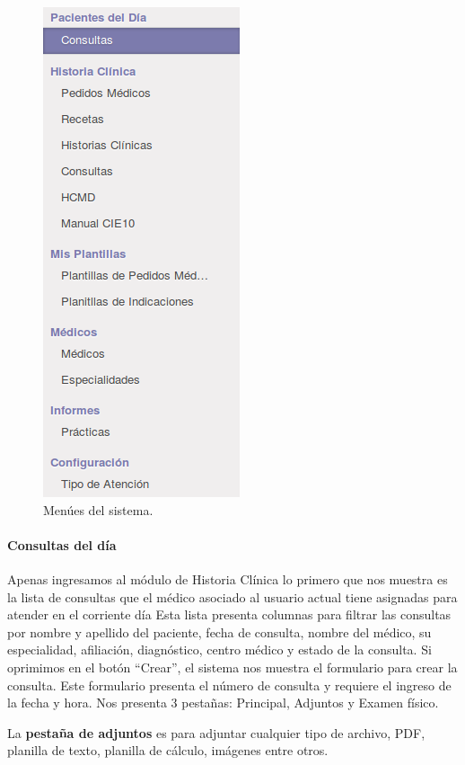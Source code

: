 \begin{figure}[h]
      \centering
      \includegraphics[height=.3\textheight]{img/tp1/HE/MenuHC}
      \caption{Menúes del sistema.}
      \label{submenu}
\end{figure}


\paragraph{Consultas del día}

Apenas ingresamos al módulo de Historia Clínica lo primero que nos muestra es la lista de consultas que el médico asociado al usuario actual tiene asignadas para atender en el corriente día
Esta lista presenta columnas para filtrar las consultas por nombre y apellido del paciente, fecha de consulta, nombre del médico, su especialidad, afiliación, diagnóstico, centro médico y estado de la consulta.
Si oprimimos en el botón ``Crear'', el sistema nos muestra el formulario para crear la consulta.
Este formulario presenta el número de consulta y requiere el ingreso de la fecha y hora.
Nos presenta 3 pestañas: Principal, Adjuntos y Examen físico.

La \textbf{pestaña de adjuntos} es para adjuntar cualquier tipo de archivo, PDF, planilla de texto, planilla de cálculo, imágenes entre otros.

